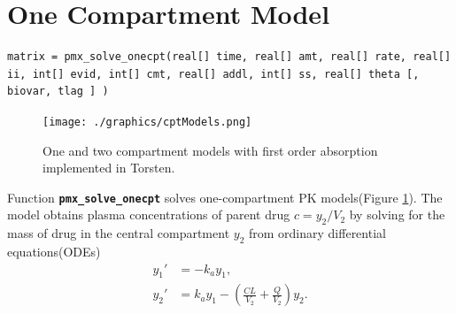 \documentclass[11pt, reqno, oneside]{amsbook}
\numberwithin{equation}{chapter}
\numberwithin{figure}{chapter}
\numberwithin{table}{chapter}
\theoremstyle{remark}
\begin{document}
\section{One Compartment Model}
\label{sec:orgb098505}
\label{sec:onecpt}
\begin{verbatim}
matrix = pmx_solve_onecpt(real[] time, real[] amt, real[] rate, real[] ii, int[] evid, int[] cmt, real[] addl, int[] ss, real[] theta [, biovar, tlag ] )
\end{verbatim}

\begin{figure}[htbp]
\centering
\texttt{[image: ./graphics/cptModels.png]}
\caption{\label{one_two_cpt_models}
One and two compartment models with first order absorption implemented in Torsten.}
\end{figure}

Function {\small \color{MRGGreen} \texttt{\textbf{pmx\_solve\_onecpt}}} solves one-compartment PK
models(Figure \ref{one_two_cpt_models}). The model obtains plasma concentrations of parent drug \(c=y_2/V_2\)
by solving for the mass of drug in the central compartment
\(y_2\) from ordinary differential equations(ODEs)
\begin{subequations}
\begin{align}
  y_1' &= -k_a y_1, \\
  y_2' &= k_a y_1 - \left(\frac{CL}{V_2} + \frac{Q}{V_2}\right) y_2.
\end{align}
\label{eq:onecpt}
\end{subequations}
\end{document}
